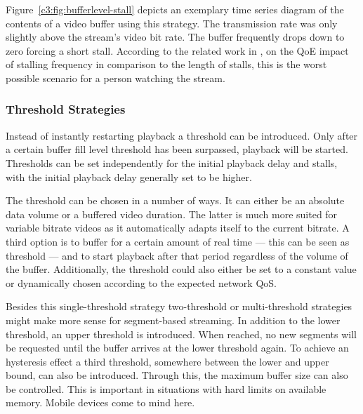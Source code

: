 Figure~\ref{c3:fig:bufferlevel-stall} depicts an exemplary time series diagram of the contents of a video buffer using this strategy. The transmission rate was only slightly above the stream's video bit rate. The buffer frequently drops down to zero forcing a short stall. According to the related work in \cite{6123395}, on the \gls{QoE} impact of stalling frequency in comparison to the length of stalls, this is the worst possible scenario for a person watching the stream.


\subsubsection{Threshold Strategies}

Instead of instantly restarting playback a threshold can be introduced. Only after a certain buffer fill level threshold has been surpassed, playback will be started. Thresholds can be set independently for the initial playback delay and stalls, with the initial playback delay generally set to be higher.

The threshold can be chosen in a number of ways. It can either be an absolute data volume or a buffered video duration. The latter is much more suited for variable bitrate videos as it automatically adapts itself to the current bitrate. A third option is to buffer for a certain amount of real time --- this can be seen as threshold --- and to start playback after that period regardless of the volume of the buffer. Additionally, the threshold could also either be set to a constant value or dynamically chosen according to the expected network \gls{QoS}.

Besides this single-threshold strategy two-threshold or multi-threshold strategies might make more sense for segment-based streaming. In addition to the lower threshold, an upper threshold is introduced. When reached, no new segments will be requested until the buffer arrives at the lower threshold again. To achieve an hysteresis effect a third threshold, somewhere between the lower and upper bound, can also be introduced. Through this, the maximum buffer size can also be controlled. This is important in situations with hard limits on available memory. Mobile devices come to mind here.


